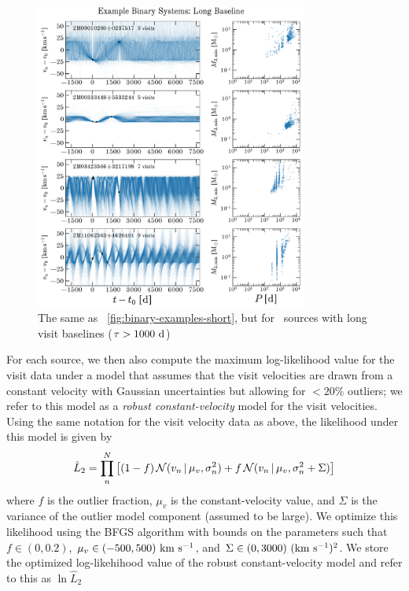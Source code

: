 \documentclass[modern]{aastex63}
\begin{document}
\begin{figure}[!t]
    \begin{center}
    \includegraphics[width=0.8\textwidth]{example-binaries-long.pdf}
    \end{center}
    \caption{%
    The same as \figurename~\ref{fig:binary-examples-short}, but for \apogee\
    sources with long visit baselines ($\tau > 1000~\mathrm{d}$)
    \label{fig:binary-examples-long}
    }
\end{figure}

For each source, we then also compute the maximum log-likelihood value for the
visit data under a model that assumes that the visit velocities are drawn from a
constant velocity with Gaussian uncertainties but allowing for $<20\%$ outliers;
we refer to this model as a \emph{robust constant-velocity} model for the visit
velocities.
Using the same notation for the visit velocity data as above, the likelihood
under this model is given by
\begin{equation}
    \hat{L}_2 = \prod_n^N \left[(1-f) \,
        \mathcal{N}(v_n \given \mu_v, \sigma_n^2)
        + f\, \mathcal{N}(v_n \given \mu_v, \sigma_n^2 + \Sigma) \right]
\end{equation}
where $f$ is the outlier fraction, $\mu_v$ is the constant-velocity value, and
$\Sigma$ is the variance of the outlier model component (assumed to be large).
We optimize this likelihood using the BFGS algorithm \citep{Nocedal:2006} with
bounds on the parameters such that $f \in (0, 0.2)$, $\mu_v \in (-500,
500)~\mathrm{km}~\mathrm{s}^{-1}$, and $\Sigma \in (0, 3000)~(\mathrm{km}~\mathrm{s}^{-1})^2$.
We store the optimized log-likehihood value of the robust constant-velocity
model and refer to this as $\ln \hat{L}_2$
\end{document}
